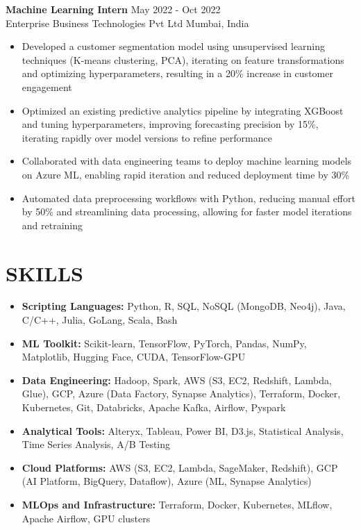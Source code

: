 \documentclass[12pt,a4paper]{article}
\newcommand{\workexp}[4]{
  \textbf{#1} \hfill #2\\
  #3 \hfill #4\\
  \vspace{-1em} %
}
\begin{document}
\workexp{Machine Learning Intern}{May 2022 - Oct 2022}{Enterprise Business Technologies Pvt Ltd}{Mumbai, India}
\begin{itemize}[leftmargin=*,noitemsep,topsep=0pt]
\item Developed a customer segmentation model using unsupervised learning techniques (K-means clustering, PCA), iterating on feature transformations and optimizing hyperparameters, resulting in a 20\% increase in customer engagement
\item Optimized an existing predictive analytics pipeline by integrating XGBoost and tuning hyperparameters, improving forecasting precision by 15\%, iterating rapidly over model versions to refine performance
\item Collaborated with data engineering teams to deploy machine learning models on Azure ML, enabling rapid iteration and reduced deployment time by 30\%
\item Automated data preprocessing workflows with Python, reducing manual effort by 50\% and streamlining data processing, allowing for faster model iterations and retraining
\end{itemize}

\section*{SKILLS}
\begin{itemize}[leftmargin=*,noitemsep,topsep=0pt]
\item \textbf{Scripting Languages:} Python, R, SQL, NoSQL (MongoDB, Neo4j), Java, C/C++, Julia, GoLang, Scala, Bash
\item \textbf{ML Toolkit:} Scikit-learn, TensorFlow, PyTorch, Pandas, NumPy, Matplotlib, Hugging Face, CUDA, TensorFlow-GPU
\item \textbf{Data Engineering:} Hadoop, Spark, AWS (S3, EC2, Redshift, Lambda, Glue), GCP, Azure (Data Factory, Synapse Analytics), Terraform, Docker, Kubernetes, Git, Databricks, Apache Kafka, Airflow, Pyspark
\item \textbf{Analytical Tools:} Alteryx, Tableau, Power BI, D3.js, Statistical Analysis, Time Series Analysis, A/B Testing
\item \textbf{Cloud Platforms:} AWS (S3, EC2, Lambda, SageMaker, Redshift), GCP (AI Platform, BigQuery, Dataflow), Azure (ML, Synapse Analytics)
\item \textbf{MLOps and Infrastructure:} Terraform, Docker, Kubernetes, MLflow, Apache Airflow, GPU clusters
\end{itemize}
\end{document}
